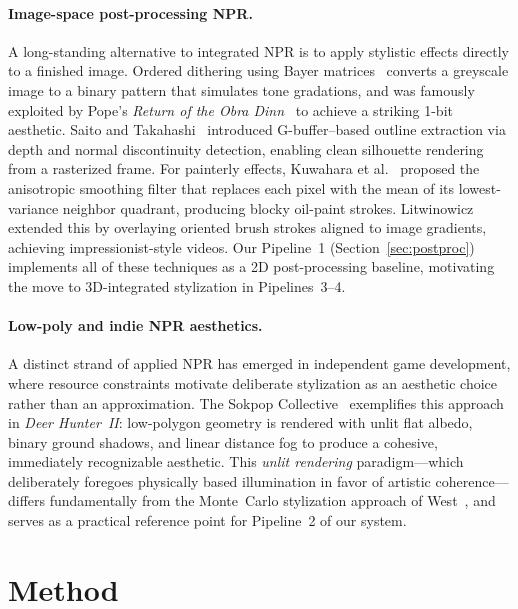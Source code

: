 \documentclass{article}
\begin{document}
\paragraph{Image-space post-processing NPR.}
A long-standing alternative to integrated NPR is to apply stylistic effects directly to a finished image.
Ordered dithering using Bayer matrices~\cite{floyd1976adaptive} converts a greyscale image to a binary pattern that simulates tone gradations, and was famously exploited by Pope's \emph{Return of the Obra Dinn}~\cite{obradinn2018} to achieve a striking 1-bit aesthetic.
Saito and Takahashi~\cite{saito1990comprehensible} introduced G-buffer--based outline extraction via depth and normal discontinuity detection, enabling clean silhouette rendering from a rasterized frame.
For painterly effects, Kuwahara et al.~\cite{kuwahara1976processing} proposed the anisotropic smoothing filter that replaces each pixel with the mean of its lowest-variance neighbor quadrant, producing blocky oil-paint strokes.
Litwinowicz~\cite{litwinowicz1997processing} extended this by overlaying oriented brush strokes aligned to image gradients, achieving impressionist-style videos.
Our Pipeline~1 (Section~\ref{sec:postproc}) implements all of these techniques as a 2D post-processing baseline, motivating the move to 3D-integrated stylization in Pipelines~3--4.

\paragraph{Low-poly and indie NPR aesthetics.}
A distinct strand of applied NPR has emerged in independent game development, where resource constraints motivate deliberate stylization as an aesthetic choice rather than an approximation.
The Sokpop Collective~\cite{sokpop2019deerhunter} exemplifies this approach in \emph{Deer Hunter~II}: low-polygon geometry is rendered with unlit flat albedo, binary ground shadows, and linear distance fog to produce a cohesive, immediately recognizable aesthetic.
This \emph{unlit rendering} paradigm---which deliberately foregoes physically based illumination in favor of artistic coherence---differs fundamentally from the Monte~Carlo stylization approach of West~\cite{west2024stylized}, and serves as a practical reference point for Pipeline~2 of our system.


\section{Method}
\label{sec:method}
\end{document}
